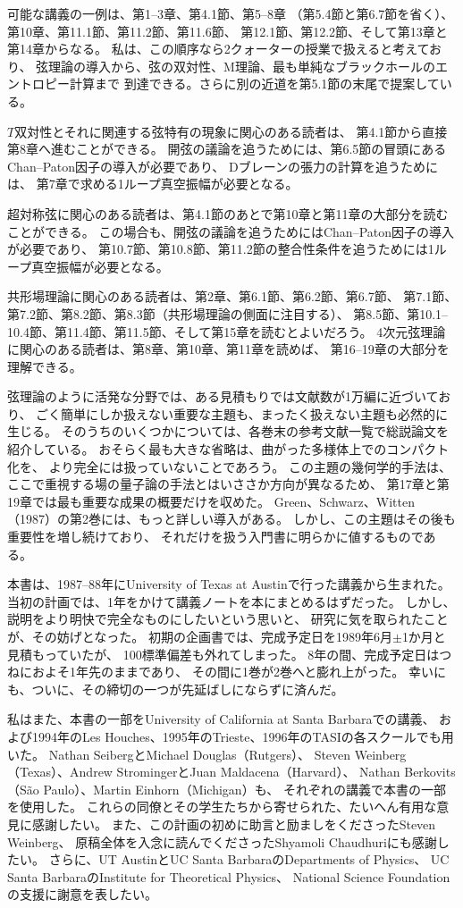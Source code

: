 可能な講義の一例は、第1--3章、第4.1節、第5--8章
（第5.4節と第6.7節を省く）、第10章、第11.1節、第11.2節、第11.6節、
第12.1節、第12.2節、そして第13章と第14章からなる。
私は、この順序なら2クォーターの授業で扱えると考えており、
弦理論の導入から、弦の双対性、M理論、最も単純なブラックホールのエントロピー計算まで
到達できる。さらに別の近道を第5.1節の末尾で提案している。

$T$双対性とそれに関連する弦特有の現象に関心のある読者は、
第4.1節から直接第8章へ進むことができる。
開弦の議論を追うためには、第6.5節の冒頭にあるChan--Paton因子の導入が必要であり、
Dブレーンの張力の計算を追うためには、
第7章で求める1ループ真空振幅が必要となる。

超対称弦に関心のある読者は、第4.1節のあとで第10章と第11章の大部分を読むことができる。
この場合も、開弦の議論を追うためにはChan--Paton因子の導入が必要であり、
第10.7節、第10.8節、第11.2節の整合性条件を追うためには1ループ真空振幅が必要となる。

共形場理論に関心のある読者は、第2章、第6.1節、第6.2節、第6.7節、
第7.1節、第7.2節、第8.2節、第8.3節（共形場理論の側面に注目する）、
第8.5節、第10.1--10.4節、第11.4節、第11.5節、そして第15章を読むとよいだろう。
4次元弦理論に関心のある読者は、第8章、第10章、第11章を読めば、
第16--19章の大部分を理解できる。

弦理論のように活発な分野では、ある見積もりでは文献数が1万編に近づいており、
ごく簡単にしか扱えない重要な主題も、まったく扱えない主題も必然的に生じる。
そのうちのいくつかについては、各巻末の参考文献一覧で総説論文を紹介している。
おそらく最も大きな省略は、曲がった多様体上でのコンパクト化を、
より完全には扱っていないことであろう。
この主題の幾何学的手法は、ここで重視する場の量子論の手法とはいささか方向が異なるため、
第17章と第19章では最も重要な成果の概要だけを収めた。
Green、Schwarz、Witten（1987）\cite{Green:1987mn}の第2巻には、もっと詳しい導入がある。
しかし、この主題はその後も重要性を増し続けており、
それだけを扱う入門書に明らかに値するものである。

本書は、1987--88年にUniversity of Texas at Austinで行った講義から生まれた。
当初の計画では、1年をかけて講義ノートを本にまとめるはずだった。
しかし、説明をより明快で完全なものにしたいという思いと、
研究に気を取られたことが、その妨げとなった。
初期の企画書では、完成予定日を1989年6月$\pm$1か月と見積もっていたが、
100標準偏差も外れてしまった。
8年の間、完成予定日はつねにおよそ1年先のままであり、
その間に1巻が2巻へと膨れ上がった。
幸いにも、ついに、その締切の一つが先延ばしにならずに済んだ。

私はまた、本書の一部をUniversity of California at Santa Barbaraでの講義、
および1994年のLes Houches、1995年のTrieste、1996年のTASIの各スクールでも用いた。
Nathan SeibergとMichael Douglas（Rutgers）、
Steven Weinberg（Texas）、Andrew StromingerとJuan Maldacena（Harvard）、
Nathan Berkovits（São Paulo）、Martin Einhorn（Michigan）も、
それぞれの講義で本書の一部を使用した。
これらの同僚とその学生たちから寄せられた、たいへん有用な意見に感謝したい。
また、この計画の初めに助言と励ましをくださったSteven Weinberg、
原稿全体を入念に読んでくださったShyamoli Chaudhuriにも感謝したい。
さらに、UT AustinとUC Santa BarbaraのDepartments of Physics、
UC Santa BarbaraのInstitute for Theoretical Physics、
National Science Foundationの支援に謝意を表したい。

